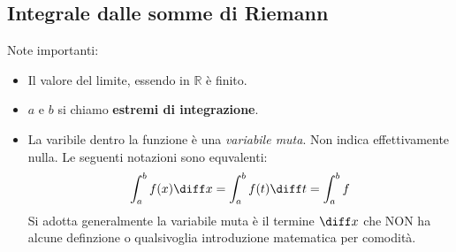 \subsection{Integrale dalle somme di Riemann} 

Note importanti:
\begin{itemize}
	\item Il valore del limite, essendo in $\mathbb{R}$ è finito.
	
	\item $a$ e $b$ si chiamo \textbf{estremi di integrazione}.

	\item La varibile dentro la funzione è una \textit{variabile muta}. Non 
        indica effettivamente nulla. Le seguenti notazioni sono equvalenti:
		\begin{equation*}
			\int_a^b f(x) \diff x = \int_a^b f(t) \diff t = \int_a^b f
		\end{equation*}
		Si adotta generalmente la variabile muta è il termine $\diff x$ che 
        NON ha alcune definzione o qualsivoglia introduzione matematica per 
        comodità.
\end{itemize}

